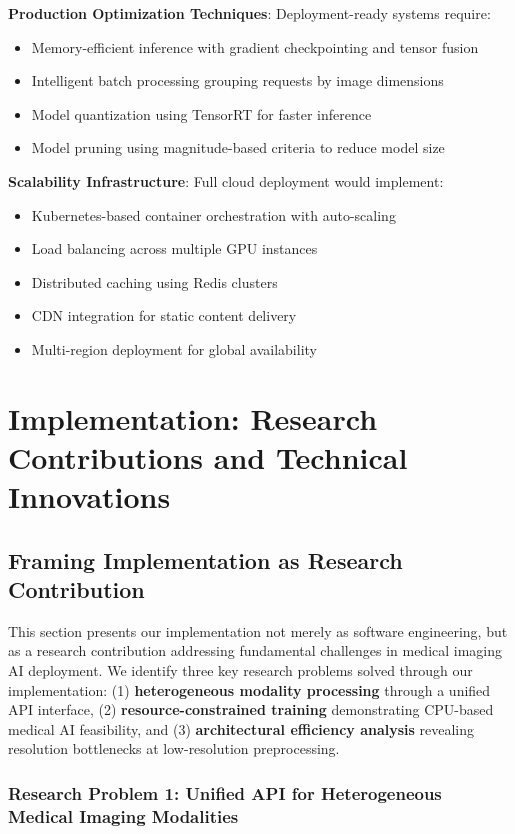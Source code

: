 \documentclass[12pt,a4paper]{article}
\begin{document}
\textbf{Production Optimization Techniques}: Deployment-ready systems require:
\begin{itemize}
    \item Memory-efficient inference with gradient checkpointing and tensor fusion
    \item Intelligent batch processing grouping requests by image dimensions
    \item Model quantization using TensorRT for faster inference
    \item Model pruning using magnitude-based criteria to reduce model size
\end{itemize}

\textbf{Scalability Infrastructure}: Full cloud deployment would implement:
\begin{itemize}
    \item Kubernetes-based container orchestration with auto-scaling
    \item Load balancing across multiple GPU instances
    \item Distributed caching using Redis clusters
    \item CDN integration for static content delivery
    \item Multi-region deployment for global availability
\end{itemize}

\section{Implementation: Research Contributions and Technical Innovations}

\subsection{Framing Implementation as Research Contribution}

This section presents our implementation not merely as software engineering, but as a research contribution addressing fundamental challenges in medical imaging AI deployment. We identify three key research problems solved through our implementation: (1) \textbf{heterogeneous modality processing} through a unified API interface, (2) \textbf{resource-constrained training} demonstrating CPU-based medical AI feasibility, and (3) \textbf{architectural efficiency analysis} revealing resolution bottlenecks at low-resolution preprocessing.

\subsubsection{Research Problem 1: Unified API for Heterogeneous Medical Imaging Modalities}
\end{document}
